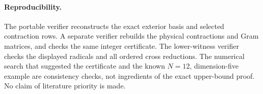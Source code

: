 \documentclass[11pt]{article}
\begin{document}
\paragraph{Reproducibility.} The portable verifier reconstructs the exact exterior basis and selected contraction rows. A separate verifier rebuilds the physical contractions and Gram matrices, and checks the same integer certificate. The lower-witness verifier checks the displayed radicals and all ordered cross reductions. The numerical search that suggested the certificate and the known $N=12$, dimension-five example are consistency checks, not ingredients of the exact upper-bound proof. No claim of literature priority is made.
\end{document}
